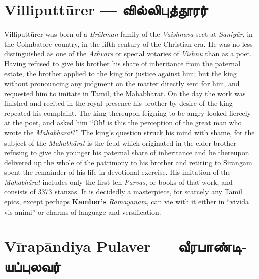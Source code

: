 \documentclass{article}
\newcommand{\TamilBold}[1]{\texttamil{\textbf{#1}}}
\newcommand{\tambold}[1]{\TamilBold{#1}}
\begin{document}
\section{Villiputt\={u}rer --- \tambold{வில்லிபுத்தூரர்}}
\paragraph{}
Villiputt\={u}rer was born of a \emph{Br\={a}hman} family of the \emph{Vaishnava} sect at \emph{Saniy\={u}r}, in the Coimbatore country, in the fifth century of the Christian era. He was no less distinguished as one of the \emph{\={A}zhv\={a}rs} or special votaries of \emph{Vishnu} than as a poet. Having refused to give his brother his share of inheritance from the paternal estate, the brother applied to the king for justice against him; but the king without pronouncing any judgment on the matter directly sent for him, and requested him to imitate in Tamil, the Mahabh\={a}rat. On the day the work was finished and recited in the royal presence his brother by desire of the king repeated his complaint. The king thereupon feigning to be angry looked fiercely at the poet, and asked him ``Oh! is this the perception of the great man who wrote the \emph{Mahabh\={a}rat}?'' The king's question struck his mind with shame, for the subject of the \emph{Mahabh\={a}rat} is the feud which originated in the elder brother refusing to give the younger his paternal share of inheritance and he thereupon delivered up the whole of the patrimony to his brother and retiring to Sirangam spent the remainder of his life in devotional exercise. His imitation of the \emph{Mahabh\={a}rat} includes only the first ten \emph{Parvas}, or books of that work, and consists of 3373 stanzas. It is decidedly a masterpiece, for scarcely any Tamil epics, except perhaps \textbf{Kamber's} \emph{Ramayanam}, can vie with it either in ``vivida vis animi'' or charms of language and versification.

\section{V\={i}rap\={a}ndiya Pulaver --- \tambold{வீரபாண்டியப்புலவர்}}
\end{document}
